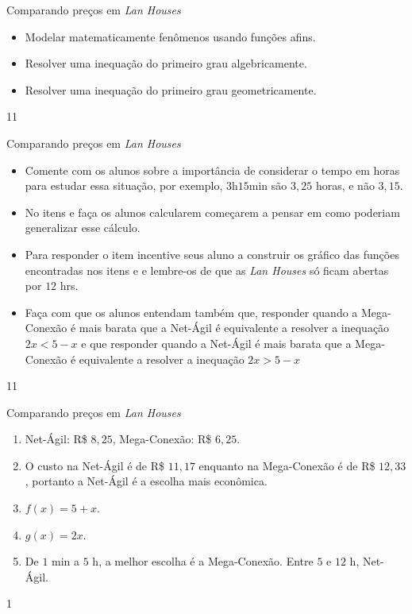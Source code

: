 \clearpage
\def\currentcolor{session2}
\begin{objectives}{Comparando preços em \textit{Lan Houses}}
{
\begin{itemize}
\item Modelar matematicamente fenômenos usando funções afins. 
\item Resolver uma inequação do primeiro grau algebricamente.
\item Resolver uma inequação do primeiro grau geometricamente.
\end{itemize}
}{1}{1}
\end{objectives}
\begin{sugestions}{Comparando preços em \textit{Lan Houses}}
{
\begin{itemize}
\item Comente com os alunos sobre a importância de considerar o tempo em horas para estudar essa situação, por exemplo, $3$h$15$min são $3,25$ horas, e não $3,15$.
\item No itens  e  faça os alunos calcularem começarem a pensar em como poderiam generalizar esse cálculo.
\item Para responder o item  incentive seus aluno a construir os gráfico das funções encontradas nos itens  e  e lembre-os de que as \textit{Lan Houses} só ficam abertas por $12$ hrs. 
\item Faça com que os alunos entendam também que, responder quando a Mega-Conexão é mais barata que a Net-Ágil é equivalente a resolver a inequação $2x<5-x$ e que responder quando a Net-Ágil é mais barata que a Mega-Conexão é equivalente a resolver a inequação $2x>5-x$
\end{itemize}
}{1}{1}
\end{sugestions}
\begin{answer}{Comparando preços em \textit{Lan Houses}}
{
\begin{enumerate}
\item Net-Ágil: R\$ $8{,}25$, Mega-Conexão:  R\$ $6{,}25$.
\item  O custo na Net-Ágil é de  R\$ $11{,}17$ enquanto na Mega-Conexão é de R\$ $12{,}33$, portanto a Net-Ágil é a escolha mais econômica.
\item $f(x)=5+x$.
\item $g(x)=2x$.
\item De $1$ min a $5$ h, a melhor escolha é a Mega-Conexão. Entre $5$ e $12$ h, Net-Ágil.
\end{enumerate}
}{1}
\end{answer}
